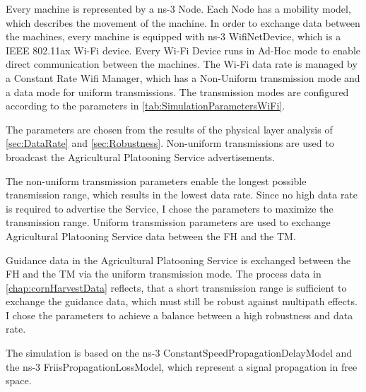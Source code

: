 Every machine is represented by a ns-3 Node.
Each Node has a mobility model, which describes the movement of the machine.
In order to exchange data between the machines, every machine is equipped with ns-3 WifiNetDevice, which is a IEEE 802.11ax
Wi-Fi device.
Every Wi-Fi Device runs in Ad-Hoc mode to enable direct communication
between the machines.
The Wi-Fi data rate is managed by a Constant Rate Wifi Manager, which has a Non-Uniform
transmission mode and a data mode for uniform transmissions.
The transmission modes are configured according
to the parameters in \autoref{tab:SimulationParametersWiFi}.

The parameters are chosen from the results of the physical layer analysis of
\autoref{sec:DataRate} and \autoref{sec:Robustness}.
Non-uniform transmissions are used to broadcast the Agricultural Platooning
Service advertisements.

The non-uniform transmission parameters enable the longest possible
transmission range, which results in the lowest data rate.
Since no high data rate is required to advertise the Service, I chose the parameters to maximize the transmission range.
Uniform transmission parameters are used to exchange Agricultural Platooning Service data between
the \ac{FH} and the \ac{TM}. 

Guidance data in the Agricultural Platooning Service is exchanged between the \ac{FH} and the \ac{TM} via the
uniform transmission mode.
The process data in \autoref{chap:cornHarvestData} reflects, that a short transmission range
is sufficient to exchange the guidance data, which must still be robust against multipath effects.
I chose the parameters to achieve a balance between a high robustness and data rate.

The simulation is based on the ns-3 ConstantSpeedPropagationDelayModel and the  ns-3 FriisPropagationLossModel,
which represent a signal propagation in free space.

